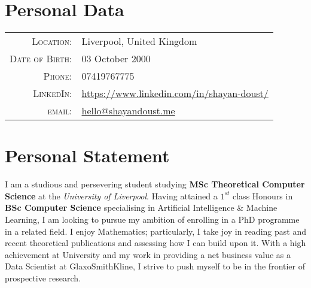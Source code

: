 \documentclass[a4paper,10pt]{article} %
\begin{document}
\pagestyle{empty} %


\par{\bigskip\par} %

\section{Personal Data}

\begin{tabular}{rl}
\textsc{Location:} & Liverpool, United Kingdom \\
\textsc{Date of Birth:} & 03 October 2000 \\
\textsc{Phone:} & 07419767775\\
\textsc{LinkedIn:} & \href{https://www.linkedin.com/in/shayan-doust/}{https://www.linkedin.com/in/shayan-doust/} \\
\textsc{email:} & \href{mailto:hello@shayandoust.me}{hello@shayandoust.me} \\
\end{tabular}


\section{Personal Statement}

I am a studious and persevering student studying \textbf{MSc Theoretical Computer Science} at the \textit{University of Liverpool}. Having attained a $1^{st}$ class Honours in \textbf{BSc Computer Science} specialising in Artificial Intelligence \& Machine Learning, I am looking to pursue my ambition of enrolling in a PhD programme  in a related field. I enjoy Mathematics; particularly, I take joy in reading past and recent theoretical publications and assessing how I can build upon it. With a high achievement at University and my work in providing a net business value as a Data Scientist at GlaxoSmithKline, I strive to push myself to be in the frontier of prospective research. 
\end{document}
